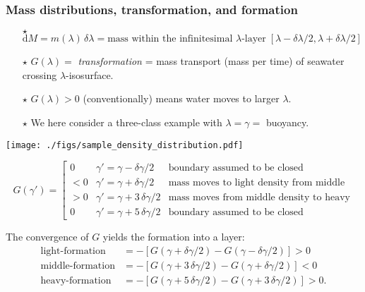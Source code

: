 \documentclass[10pt]{beamer}
\begin{document}
\begin{frame}
  \frametitle{Mass distributions, transformation, and formation}
\scriptsize 

\begin{exampleblock}{}
\begin{itemize}
\item[$\star$]
  $\mathrm{d} M = m(\lambda) \, \delta \lambda = \mbox{mass within the
    infinitesimal $\lambda$-layer} \; [\lambda - \delta \lambda/2,
  \lambda + \delta \lambda/2]$
\item[$\star$]  $G(\lambda) = $ {\it transformation} = mass transport
 (mass per time) of seawater crossing $\lambda$-isosurface.
\item[$\star$]  $G(\lambda) > 0$ (conventionally) means water moves to larger $\lambda$.  
\item[$\star$] We here consider a three-class example with $\lambda = \gamma = $ buoyancy.
\end{itemize}
\end{exampleblock}

\begin{center}
{\texttt{[image: ./figs/sample\_density\_distribution.pdf]}}
\end{center}

\begin{equation*}
   G(\gamma') = 
    \left[
    \begin{array}{lll}
     0     &\gamma' = \gamma - \delta\gamma/2  &\mbox{boundary assumed to be closed} \\
     <0   &\gamma' = \gamma + \delta\gamma/2  &\mbox{mass moves to light density from middle}\\
     >0   &\gamma' = \gamma + 3 \, \delta\gamma/2  &\mbox{mass moves from middle density to heavy}\\
     0     &\gamma' = \gamma + 5\, \delta\gamma/2  &\mbox{boundary assumed to be closed} 
    \end{array}
    \right.
\end{equation*}

The convergence of $G$ yields the formation into a layer: 
\begin{align*}
  \mbox{light-formation}  &= -[G(\gamma + \delta\gamma/2) - G(\gamma - \delta\gamma/2)] > 0 
\\
  \mbox{middle-formation} &= -[G(\gamma  + 3 \, \delta\gamma/2) - G(\gamma + \delta\gamma/2)]  < 0 
\\
  \mbox{heavy-formation}  &= -[G(\gamma  + 5 \, \delta\gamma/2) - G(\gamma + 3 \, \delta\gamma/2)] > 0.  
\end{align*}


\end{frame}
\end{document}

